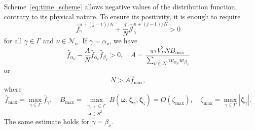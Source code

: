 \documentclass[review]{elsarticle}
\newcommand{\bzeta}{\boldsymbol{\zeta}}
\newcommand{\Nu}{\mathcal{N}}
\newcommand{\OO}[1]{O(#1)}
\begin{document}
Scheme~\eqref{eq:time_scheme} allows negative values of the distribution function,
contrary to its physical nature.
To ensure its positivity, it is enough to require
\begin{equation}\label{eq:positive_f}
    \hat{f}_\gamma^{n+(j-1)/N} + \frac{\tau}N \hat{\mathscr{J}}_\gamma^{n+(j-1)/N} > 0
\end{equation}
for all \(\gamma\in\Gamma\) and \(\nu\in\Nu_n\).
If \(\gamma = \alpha_\nu\), we have
\begin{equation}\label{eq:positive_f_alpha}
    \hat{f}_{\alpha_\nu} - \frac{A}{N}\hat{f}_{\alpha_\nu}\hat{f}_{\beta_\nu} > 0, \quad
    A = \frac{\pi\tau V_\Gamma^2 N B_{\max}}{\sum_{\nu\in\Nu} w_{\alpha_\nu}w_{\beta_\nu}}
\end{equation}
or
\begin{equation}\label{eq:positive_f_alpha2}
    N > A \hat{f}_{\max},
\end{equation}
where
\begin{equation}\label{eq:f_B_max}
    \hat{f}_{\max} = \max_{\gamma\in\Gamma} \hat{f}_\gamma, \quad
    B_{\max} = \max_{\substack{\gamma,\varsigma\in\Gamma\\\boldsymbol{\omega}\in S^2}}
        B(\boldsymbol{\omega}, \bzeta_{\gamma}, \bzeta_{\varsigma}) = \OO{\zeta_{\max}}, \quad
    \zeta_{\max} = \max_{\gamma\in\Gamma}|\bzeta_\gamma|.
\end{equation}
The same estimate holds for \(\gamma = \beta_\nu\).
\end{document}
